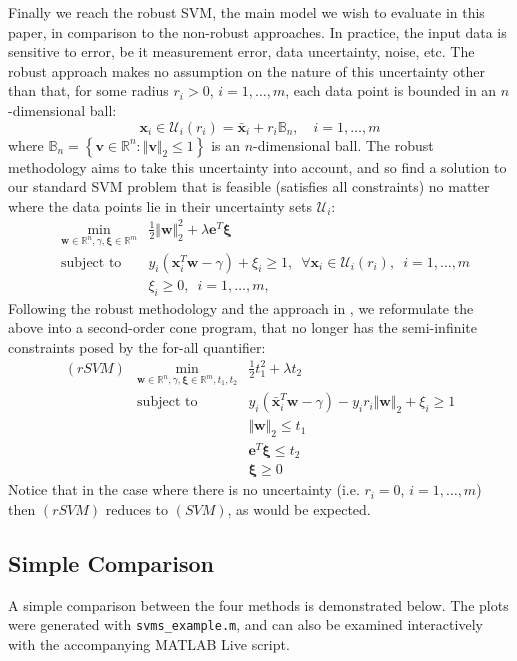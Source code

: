 \documentclass[11pt]{article}
\newcommand{\ds}{\displaystyle}
\begin{document}
Finally we reach the robust SVM, the main model we wish to evaluate in this paper, in comparison to the non-robust approaches. In practice, the input data is sensitive to error, be it measurement error, data uncertainty, noise, etc. The robust approach makes no assumption on the nature of this uncertainty other than that, for some radius $r_i>0$, $i=1,\dots,m$, each data point is bounded in an $n$-dimensional ball:
\[
\bm{x}_i\in\mathcal{U}_i(r_i) = \bar{\bm{x}}_i + r_i\mathbb{B}_n, \quad i=1,\dots,m
\]
where $\mathbb{B}_n = \left\{\bm{v}\in\mathbb{R}^n : \Vert \bm{v}\Vert_2\leq 1\right\}$ is an $n$-dimensional ball. The robust methodology aims to take this uncertainty into account, and so find a solution to our standard SVM problem that is feasible (satisfies all constraints) no matter where the data points lie in their uncertainty sets $\mathcal{U}_i$:
\begin{eqnarray*}
& \ds\min_{\bm{w}\in\mathbb{R}^n, \gamma, \bm{\xi}\in\mathbb{R}^m} & \frac{1}{2}\Vert \bm{w} \Vert_2^2 + \lambda\bm{e}^T\bm{\xi}
\\
& \mbox{subject to } & y_i(\bm{x}_i^T\bm{w} - \gamma) + \xi_i \geq 1, \enspace \forall \bm{x}_i\in\mathcal{U}_i(r_i),\enspace i=1,\dots,m
\\
& & \xi_i \geq 0, \enspace i=1,\dots,m, 
\end{eqnarray*}
Following the robust methodology and the approach in \cite{rsvm}, we reformulate the above into a second-order cone program, that no longer has the semi-infinite constraints posed by the for-all quantifier:
\begin{eqnarray*}
(rSVM) & \ds\min_{\bm{w}\in\mathbb{R}^n, \gamma, \bm{\xi}\in\mathbb{R}^m, t_1, t_2} & \frac{1}{2}t_1^2 + \lambda t_2
\\
& \mbox{subject to } & y_i\left(\bar{\bm{x}}_i^T\bm{w}-\gamma\right) - y_ir_i\Vert\bm{w}\Vert_2 + \xi_i \geq 1
\\
& & \Vert \bm{w} \Vert_2 \leq t_1
\\
& & \bm{e}^T\bm{\xi} \leq t_2
\\
& & \bm{\xi}\geq 0
\end{eqnarray*}
Notice that in the case where there is no uncertainty (i.e. $r_i=0$, $i=1,\dots,m$) then $(rSVM)$ reduces to $(SVM)$, as would be expected.

\subsection*{Simple Comparison}

A simple comparison between the four methods is demonstrated below. The plots were generated with \texttt{svms\_example.m}, and can also be examined interactively with the accompanying MATLAB Live script.
\end{document}
